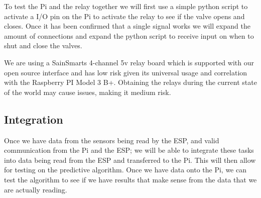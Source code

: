 \documentclass[letterpaper, 10 pt, conference]{ieeeconf}  %
\begin{document}
To test the Pi and the relay together we will first use a simple python script to activate a I/O pin on the Pi to activate the relay to see if the valve opens and closes. Once it has been confirmed that a single signal works we will expand the amount of connections and expand the python script to receive input on when to shut and close the valves.

We are using a SainSmarts 4-channel 5v relay board which is supported with our open source interface and has low risk given its universal usage and correlation with the Raspberry PI Model 3 B+. Obtaining the relays during the current state of the world may cause issues, making it medium risk.

\subsection{Integration}
Once we have data from the sensors being read by the ESP, and valid communication from the Pi and the ESP; we will be able to integrate these tasks into data being read from the ESP and transferred to the Pi. This will then allow for testing on the predictive algorithm. Once we have data onto the Pi, we can test the algorithm to see if we have results that make sense from the data that we are actually reading. 


\end{document}
